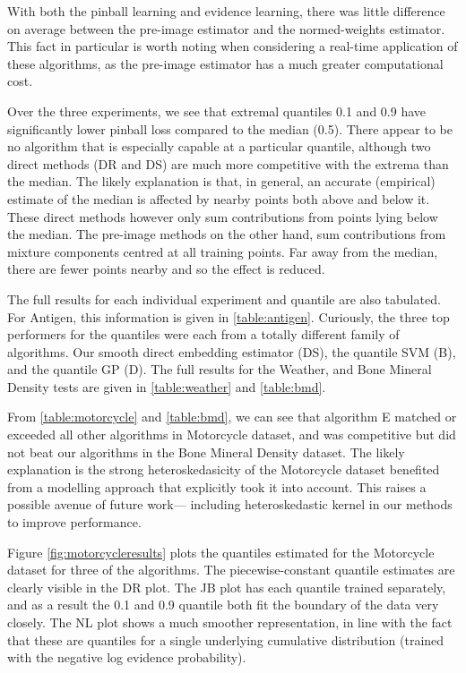 \documentclass[twoside]{article} \usepackage{aistats2017}
\theoremstyle{definition}
\begin{document}
		With both the pinball learning and evidence learning, there was little difference on average between the pre-image estimator and the normed-weights estimator. This fact in particular is worth noting when considering a real-time application of these algorithms, as the pre-image estimator has a much greater computational cost.
		
		Over the three experiments, we see that extremal quantiles 0.1 and 0.9 have significantly lower pinball loss compared to the median (0.5). There appear to be no algorithm that is especially capable at a particular quantile, although two direct methods (DR and DS) are much more competitive with the extrema than the median. The likely explanation is that, in general, an accurate (empirical) estimate of the median is affected by nearby points both above and below it. These direct methods however only sum contributions from points lying below the median. The pre-image methods on the other hand, sum contributions from mixture components centred at all training points. Far away from the median, there are fewer points nearby and so the effect is reduced.
		
		The full results for each individual experiment and quantile are also tabulated. For Antigen, this information is given in \cref{table:antigen}. Curiously, the three top performers for the quantiles were each from a totally different family of algorithms. Our smooth direct embedding estimator (DS), the quantile SVM (B), and the quantile GP (D). The full results for the Weather, and Bone Mineral Density tests are given in \cref{table:weather} and \cref{table:bmd}.
		
		From \cref{table:motorcycle} and \cref{table:bmd}, we can see that algorithm E matched or exceeded all other algorithms in Motorcycle dataset, and was competitive but did not beat our algorithms in the Bone Mineral Density dataset. The likely explanation is the strong heteroskedasicity of the Motorcycle dataset benefited from a modelling approach that explicitly took it into account. This raises a possible avenue of future work--- including heteroskedastic kernel in our methods to improve performance.
		
		Figure \ref{fig:motorcycleresults} plots the quantiles estimated for the Motorcycle dataset for three of the algorithms. The piecewise-constant quantile estimates are clearly visible in the DR plot. The JB plot has each quantile trained separately, and as a result the 0.1 and 0.9 quantile both fit the boundary of the data very closely. The NL plot shows a much smoother representation, in line with the fact that these are quantiles for a single underlying cumulative distribution (trained with the negative log evidence probability).
\end{document}
